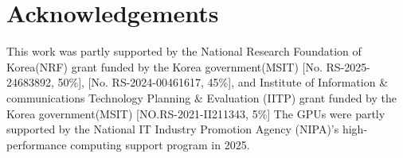 \documentclass{article}
\begin{document}
\section{Acknowledgements}
This work was partly supported by the National Research Foundation of Korea(NRF) grant funded by the Korea government(MSIT) [No. RS-2025-24683892, 50\%], [No. RS-2024-00461617, 45\%], and Institute of Information \& communications Technology Planning \& Evaluation (IITP) grant funded by the Korea government(MSIT) [NO.RS-2021-II211343, 5\%] The GPUs were partly supported by the National IT Industry Promotion Agency (NIPA)'s high-performance computing support program in 2025.




\end{document}
